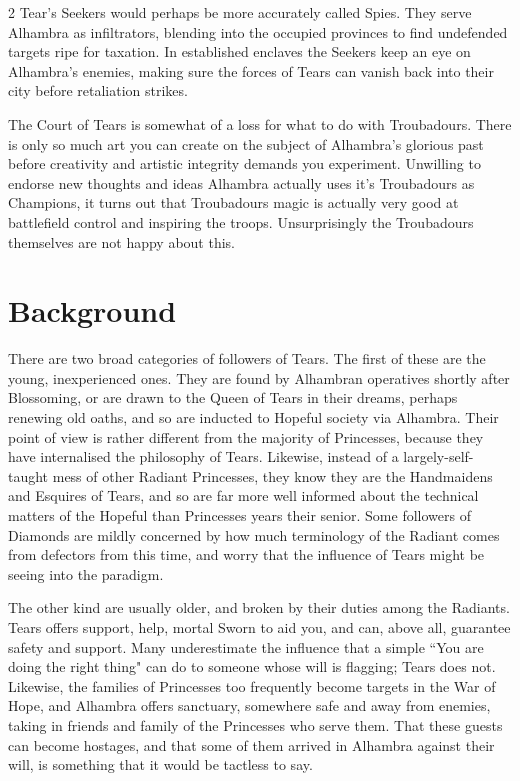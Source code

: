 \begin{multicols}{2}
Tear's Seekers would perhaps be more accurately called Spies. They serve Alhambra as infiltrators, blending into the occupied provinces to find undefended targets ripe for taxation. In established enclaves the Seekers keep an eye on Alhambra's enemies, making sure the forces of Tears can vanish back into their city before retaliation strikes. 

The Court of Tears is somewhat of a loss for what to do with Troubadours. There is only so much art you can create on the subject of Alhambra's glorious past before creativity and artistic integrity demands you experiment. Unwilling to endorse new thoughts and ideas Alhambra actually uses it's Troubadours as Champions, it turns out that Troubadours magic is actually very good at battlefield control and inspiring the troops. Unsurprisingly the Troubadours themselves are not happy about this. 

\section*{Background}
There are two broad categories of followers of Tears. The first of these are the young, inexperienced ones. They are found by Alhambran operatives shortly after Blossoming, or are drawn to the Queen of Tears in their dreams, perhaps renewing old oaths, and so are inducted to Hopeful society via Alhambra. Their point of view is rather different from the majority of Princesses, because they have internalised the philosophy of Tears. Likewise, instead of a largely-self-taught mess of other Radiant Princesses, they know they are the Handmaidens and Esquires of Tears, and so are far more well informed about the technical matters of the Hopeful than Princesses years their senior. Some followers of Diamonds are mildly concerned by how much terminology of the Radiant comes from defectors from this time, and worry that the influence of Tears might be seeing into the paradigm.

The other kind are usually older, and broken by their duties among the Radiants. Tears offers support, help, mortal Sworn to aid you, and can, above all, guarantee safety and support. Many underestimate the influence that a simple \textquotedblleft You are doing the right thing" can do to someone whose will is flagging; Tears does not. Likewise, the families of Princesses too frequently become targets in the War of Hope, and Alhambra offers sanctuary, somewhere safe and away from enemies, taking in friends and family of the Princesses who serve them. That these guests can become hostages, and that some of them arrived in Alhambra against their will, is something that it would be tactless to say. 


\end{multicols}
